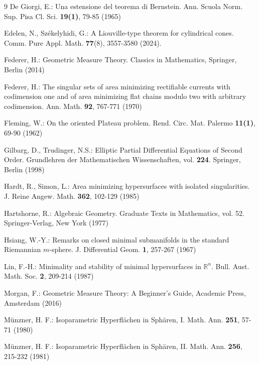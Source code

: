 \documentclass[pdflatex,sn-mathphys-num]{sn-jnl}%
\theoremstyle{thmstyleone}%
\theoremstyle{thmstyletwo}%
\theoremstyle{thmstylethree}%
\begin{document}
\begin{thebibliography}{9}
	De Giorgi, E.: Una estensione del teorema di Bernstein. Ann. Scuola Norm. Sup. Pisa Cl. Sci. \textbf{19(1)}, 79-85 (1965)
	
	Edelen, N., Sz\'ekelyhidi, G.: A Liouville-type theorem for cylindrical cones. Comm. Pure Appl. Math. \textbf{77}(8), 3557-3580 (2024).
	
	Federer, H.: Geometric Measure Theory. Classics in Mathematics, Springer, Berlin (2014)
	
	Federer, H.: The singular sets of area minimizing rectifiable currents with codimension one and of area minimizing flat chains modulo two with arbitrary codimension. Ann. Math. \textbf{92}, 767-771 (1970)
	
	
	Fleming, W.: On the oriented Plateau problem. Rend. Circ. Mat. Palermo \textbf{11(1)}, 69-90 (1962)
	
	Gilbarg, D., Trudinger, N.S.: Elliptic Partial Differential Equations of Second Order. Grundlehren der Mathematischen Wissenschaften, vol. \textbf{224}. Springer, Berlin (1998)
	
	Hardt, R., Simon, L.: Area minimizing hypersurfaces with isolated singularities. J. Reine Angew. Math. \textbf{362}, 102-129 (1985)
	
	Hartshorne, R.: Algebraic Geometry. Graduate Texts in Mathematics, vol. 52. Springer-Verlag, New York (1977)
	
	Hsiang, W.-Y.: Remarks on closed minimal submanifolds in the standard Riemannian $m$-sphere. J. Differential Geom. \textbf{1}, 257-267 (1967)
	
	Lin, F.-H.: Minimality and stability of minimal hypersurfaces in $\mathbb{R}^n$. Bull. Aust. Math. Soc. \textbf{2}, 209-214 (1987)
	
	Morgan, F.: Geometric Measure Theory: A Beginner's Guide, Academic Press, Amsterdam (2016)
	
	M\"unzner, H. F.: Isoparametric Hyperfl\"achen in Sph\"aren, I. Math. Ann. \textbf{251}, 57-71 (1980)
	
	M\"unzner, H. F.: Isoparametric Hyperfl\"achen in Sph\"aren, II. Math. Ann. \textbf{256}, 215-232 (1981)
	

\end{thebibliography}
\end{document}
